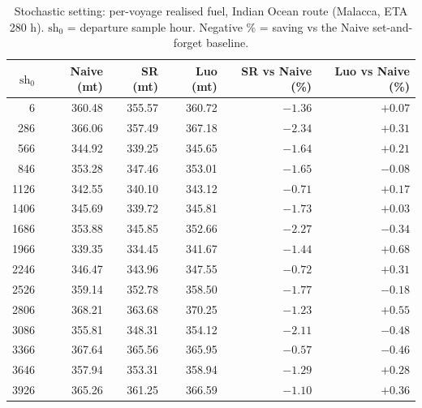 \documentclass[review,authoryear]{elsarticle}
\begin{document}
\begin{table}[H]
\centering
\caption{Stochastic setting: per-voyage realised fuel, Indian Ocean route (Malacca, ETA 280 h). $\mathrm{sh}_0$ =
departure sample hour. Negative \% = saving vs the Naive set-and-forget baseline.}
\label{tab:stoch-r1}
\begin{tabular}{rrrrrr}
\toprule
$\mathrm{sh}_0$ & Naive (mt) & SR (mt) & Luo (mt) & SR vs Naive (\%) & Luo vs Naive (\%) \\
\midrule
6    & 360.48 & 355.57 & 360.72 & $-1.36$ & $+0.07$ \\
286  & 366.06 & 357.49 & 367.18 & $-2.34$ & $+0.31$ \\
566  & 344.92 & 339.25 & 345.65 & $-1.64$ & $+0.21$ \\
846  & 353.28 & 347.46 & 353.01 & $-1.65$ & $-0.08$ \\
1126 & 342.55 & 340.10 & 343.12 & $-0.71$ & $+0.17$ \\
1406 & 345.69 & 339.72 & 345.81 & $-1.73$ & $+0.03$ \\
1686 & 353.88 & 345.85 & 352.66 & $-2.27$ & $-0.34$ \\
1966 & 339.35 & 334.45 & 341.67 & $-1.44$ & $+0.68$ \\
2246 & 346.47 & 343.96 & 347.55 & $-0.72$ & $+0.31$ \\
2526 & 359.14 & 352.78 & 358.50 & $-1.77$ & $-0.18$ \\
2806 & 368.21 & 363.68 & 370.25 & $-1.23$ & $+0.55$ \\
3086 & 355.81 & 348.31 & 354.12 & $-2.11$ & $-0.48$ \\
3366 & 367.64 & 365.56 & 365.95 & $-0.57$ & $-0.46$ \\
3646 & 357.94 & 353.31 & 358.94 & $-1.29$ & $+0.28$ \\
3926 & 365.26 & 361.25 & 366.59 & $-1.10$ & $+0.36$ \\
\bottomrule
\end{tabular}
\end{table}
\end{document}
